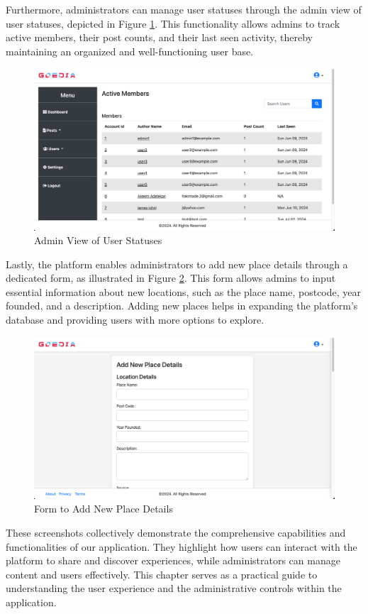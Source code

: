 Furthermore, administrators can manage user statuses through the admin view of user statuses, depicted in Figure \ref{fig:seeusersstatus}. This functionality allows admins to track active members, their post counts, and their last seen activity, thereby maintaining an organized and well-functioning user base.

\begin{figure}[H]
    \centering
    \includegraphics[width=\textwidth]{seeusersstatus.png}
    \caption{Admin View of User Statuses}
    \label{fig:seeusersstatus}
\end{figure}

Lastly, the platform enables administrators to add new place details through a dedicated form, as illustrated in Figure \ref{fig:addnewplace}. This form allows admins to input essential information about new locations, such as the place name, postcode, year founded, and a description. Adding new places helps in expanding the platform's database and providing users with more options to explore.

\begin{figure}[H]
    \centering
    \includegraphics[width=\textwidth]{addnewplace.png}
    \caption{Form to Add New Place Details}
    \label{fig:addnewplace}
\end{figure}

These screenshots collectively demonstrate the comprehensive capabilities and functionalities of our application. They highlight how users can interact with the platform to share and discover experiences, while administrators can manage content and users effectively. This chapter serves as a practical guide to understanding the user experience and the administrative controls within the application.